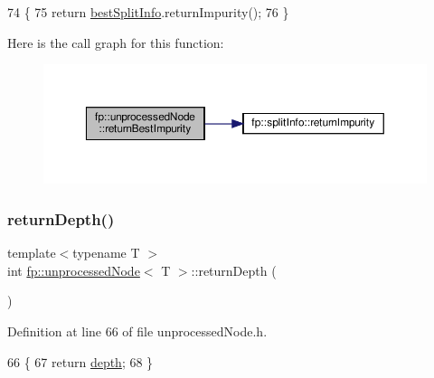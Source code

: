 \begin{DoxyCode}
74                                                   \{
75                     \textcolor{keywordflow}{return} \hyperlink{classfp_1_1unprocessedNode_a9146bd750d1f533e712634873551d060}{bestSplitInfo}.returnImpurity();
76                 \}
\end{DoxyCode}
Here is the call graph for this function\+:\nopagebreak
\begin{figure}[H]
\begin{center}
\leavevmode
\includegraphics[width=350pt]{classfp_1_1unprocessedNode_a1b147714de502bcff5c727d2ce9144f8_cgraph}
\end{center}
\end{figure}
\mbox{\label{classfp_1_1unprocessedNode_ac1b4cb820f5c29832f9a7ea7bf896139}} 
\subsubsection{\texorpdfstring{return\+Depth()}{returnDepth()}}
{\footnotesize\ttfamily template$<$typename T $>$ \\
int \hyperlink{classfp_1_1unprocessedNode}{fp\+::unprocessed\+Node}$<$ T $>$\+::return\+Depth (\begin{DoxyParamCaption}{ }\end{DoxyParamCaption})\hspace{0.3cm}{\ttfamily [inline]}}



Definition at line 66 of file unprocessed\+Node.\+h.


\begin{DoxyCode}
66                                         \{
67                     \textcolor{keywordflow}{return} \hyperlink{classfp_1_1unprocessedNode_a22ebfbc35a57e2d30b81220c94f4d0d3}{depth};
68                 \}
\end{DoxyCode}
\mbox{\label{classfp_1_1unprocessedNode_a5243ac02610f01c6b0df9d5fd6f6f857}} 
